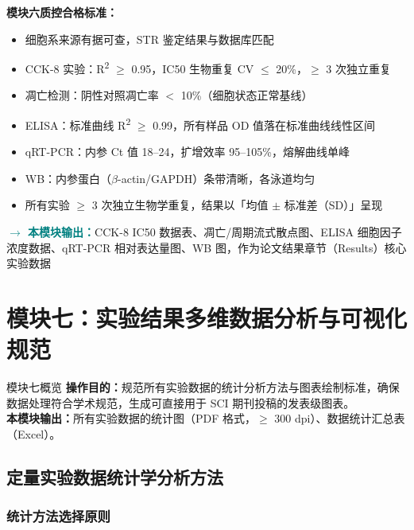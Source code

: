 \documentclass[12pt,a4paper,twoside]{article}
\newcommand{\moduleoutput}[1]{\par\vspace{6pt}\noindent\textcolor{teal}{\textbf{$\rightarrow$ 本模块输出：}}#1\vspace{6pt}}
\begin{document}
\begin{qcbox}
\textbf{模块六质控合格标准：}
\begin{itemize}
  \item 细胞系来源有据可查，STR 鉴定结果与数据库匹配 
  \item CCK-8 实验：R\textsuperscript{2} $\geq$ 0.95，IC50 生物重复 CV $\leq$ 20\%，$\geq$ 3 次独立重复 
  \item 凋亡检测：阴性对照凋亡率 $<$ 10\%（细胞状态正常基线）
  \item ELISA：标准曲线 R\textsuperscript{2} $\geq$ 0.99，所有样品 OD 值落在标准曲线线性区间 
  \item qRT-PCR：内参 Ct 值 18--24，扩增效率 95--105\%，熔解曲线单峰 
  \item WB：内参蛋白（$\beta$-actin/GAPDH）条带清晰，各泳道均匀 
  \item 所有实验 $\geq$ 3 次独立生物学重复，结果以「均值 $\pm$ 标准差（SD）」呈现 
\end{itemize}
\end{qcbox}

\moduleoutput{CCK-8 IC50 数据表、凋亡/周期流式散点图、ELISA 细胞因子浓度数据、qRT-PCR 相对表达量图、WB 图，作为论文结果章节（Results）核心实验数据}

\section{模块七：实验结果多维数据分析与可视化规范}
\label{sec:module7}

\begin{infobox}{模块七概览}
\textbf{操作目的：}规范所有实验数据的统计分析方法与图表绘制标准，确保数据处理符合学术规范，生成可直接用于 SCI 期刊投稿的发表级图表。\\
\textbf{本模块输出：}所有实验数据的统计图（PDF 格式，$\geq$ 300 dpi）、数据统计汇总表（Excel）。
\end{infobox}

\subsection{定量实验数据统计学分析方法}
\label{sec:module7_stats}

\subsubsection{统计方法选择原则}
\end{document}
